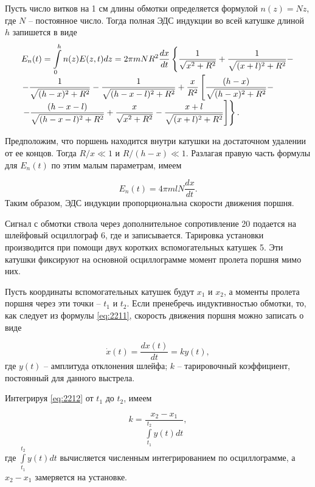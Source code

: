 \documentclass[specialist, subf, href, colorlinks=true, 14pt, final]{disser}
\theoremstyle{definition}
\begin{document}
Пусть число витков на 1 см длины обмотки определяется формулой $n(z) = Nz$, где $N$ -- постоянное число. Тогда полная ЭДС индукции во всей катушке длиной $h$ запишется в виде
\begin{equation}
	\begin{array}{l}
	E_n(t) = \displaystyle \int\limits_0^h n(z) E(z,t) dz =  2 \pi m N R^2 \frac{dx}{dt} \left\{ \frac{1}{\sqrt{x^2 + R^2}} + \frac{1}{\sqrt{(x + l)^2 + R^2}} - \right. \\ 
	\left. \displaystyle -\frac{1}{\sqrt{(h - x)^2 + R^2}} - \frac{1}{\sqrt{(h - x - l)^2 + R^2}}  + \frac{x}{R^2}\left[ \frac{(h - x)}{\sqrt{ (h-x)^2 + R^2 }} - \right. \right. \\ 
	\left. \left. \displaystyle -  \frac{(h - x - l)}{\sqrt{ (h - x - l)^2 + R^2 }} + \frac{x}{\sqrt{x^2 + R^2}} - \frac{x + l}{\sqrt{(x + l)^2 + R^2}} \right] \right\} .
	\end{array}
	\notag
\end{equation}

Предположим, что поршень находится внутри катушки на достаточном удалении от ее концов. Тогда $R/x \ll 1$ и $R/(h-x) \ll 1$. Разлагая правую часть формулы для $E_{n}(t)$ по этим малым параметрам, имеем
\addtocounter{equation}{1}
\begin{equation}\label{eq:2211}
	E_n(t) = 4 \pi m l N \frac{dx}{dt} .
  \tag{11}
\end{equation}
Таким образом, ЭДС индукции пропорциональна скорости движения поршня.

Сигнал с обмотки ствола через дополнительное сопротивление 20 подается на шлейфовый осциллограф 6, где и записывается. Тарировка установки производится при помощи двух коротких вспомогательных катушек 5. Эти катушки фиксируют на основной осциллограмме момент пролета поршня мимо них.

Пусть координаты вспомогательных катушек будут $x_1$ и $x_2$, а моменты пролета поршня через эти точки -- $t_1$ и $t_2$. Если пренебречь индуктивностью обмотки, то, как следует из формулы \eqref{eq:2211}, скорость движения поршня можно записать о виде
\addtocounter{equation}{1}
\begin{equation}\label{eq:2212}
	\dot{x}(t) = \frac{dx (t)}{dt} = ky(t),
  \tag{12}
\end{equation}
где $y(t)$ -- амплитуда отклонения шлейфа; $k$ -- тарировочный коэффициент, постоянный для данного выстрела.

Интегрируя \eqref{eq:2212} от $t_1$ до $t_2$, имеем
\addtocounter{equation}{1}
\begin{equation}\label{eq:2213}
	k = \frac{x_2 - x_1}{ \int\limits^{t_2}_{t_1} y(t)dt} ,
  \tag{13}
\end{equation}
где $\int\limits^{t_2}_{t_1} y(t)dt$ вычисляется численным интегрированием по осциллограмме, а $x_2 - x_1$ замеряется на установке.
\end{document}
